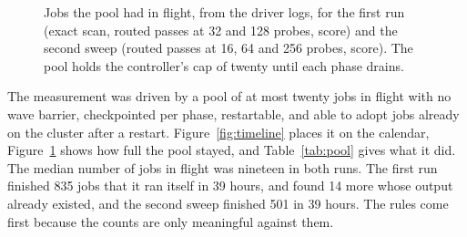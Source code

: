 \documentclass[sigconf, nonacm]{acmart}
\begin{document}
\begin{figure}[t]
\centering
{}
\caption{Jobs the pool had in flight, from the driver logs, for the first run (exact scan, routed
passes at 32 and 128 probes, score) and the second sweep (routed passes at 16, 64 and 256
probes, score). The pool holds the controller's cap of twenty until each phase drains.}
\label{fig:inflight}
\end{figure}

The measurement was driven by a pool of at most twenty jobs in flight with no wave barrier,
checkpointed per phase, restartable, and able to adopt jobs already on the cluster after a
restart. Figure~\ref{fig:timeline} places it on the calendar, Figure~\ref{fig:inflight} shows how
full the pool stayed, and Table~\ref{tab:pool} gives what it did. The median number of jobs in
flight was nineteen in both runs. The first run finished 835 jobs that it ran itself in 39 hours,
and found 14 more whose output already existed, and the second sweep finished 501 in 39 hours.
The rules come first because the counts are only meaningful against them.
\end{document}
